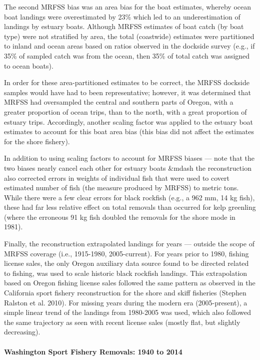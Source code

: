 \documentclass[11pt,
  english,
  letterpaper,
]{article}
\begin{document}
The second MRFSS bias was an area bias for the boat estimates, whereby ocean boat landings were overestimated by 23\% which led to an underestimation of landings by estuary boats. Although MRFSS estimates of boat catch (by boat type) were not stratified by area, the total (coastwide) estimates were partitioned to inland and ocean areas based on ratios observed in the dockside survey (e.g., if 35\% of sampled catch was from the ocean, then 35\% of total catch was assigned to ocean boats).

In order for these area-partitioned estimates to be correct, the MRFSS dockside samples would have had to been representative; however, it was determined that MRFSS had oversampled the central and southern parts of Oregon, with a greater proportion of ocean trips, than to the north, with a great proportion of estuary trips. Accordingly, another scaling factor was applied to the estuary boat estimates to account for this boat area bias (this bias did not affect the estimates for the shore fishery).

In addition to using scaling factors to account for MRFSS biases --- note that the two biases nearly cancel each other for estuary boats \&mdash the reconstruction also corrected errors in weights of individual fish that were used to covert estimated number of fish (the measure produced by MRFSS) to metric tons. While there were a few clear errors for black rockfish (e.g., a 962 mm, 14 kg fish), these had far less relative effect on total removals than occurred for kelp greenling (where the erroneous 91 kg fish doubled the removals for the shore mode in 1981).

Finally, the reconstruction extrapolated landings for years --- outside the scope of MRFSS coverage (i.e., 1915-1980, 2005-current). For years prior to 1980, fishing license sales, the only Oregon auxiliary data source found to be directed related to fishing, was used to scale historic black rockfish landings. This extrapolation based on Oregon fishing license sales followed the same pattern as observed in the California sport fishery reconstruction for the shore and skiff fisheries (Stephen Ralston et al. 2010). For missing years during the modern era (2005-present), a simple linear trend of the landings from 1980-2005 was used, which also followed the same trajectory as seen with recent license sales (mostly flat, but slightly decreasing).

\hypertarget{washington-sport-fishery-removals-1940-to-2014}{%
\paragraph{Washington Sport Fishery Removals: 1940 to 2014}\label{washington-sport-fishery-removals-1940-to-2014}}
\end{document}
